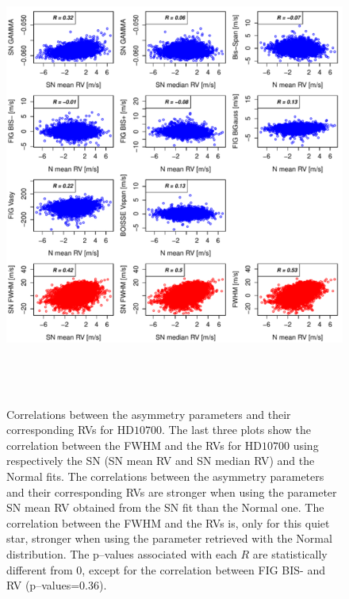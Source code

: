 \documentclass{aa}
\begin{document}
\begin{figure}[htbp]
\begin{center}
\includegraphics[height = 6in]{HD10700_[4]Comparison_para.pdf}  
   \caption{Correlations between the asymmetry parameters and their corresponding RVs for $\text{HD}10700$. The last three plots show the correlation between the FWHM and the RVs for $\text{HD}10700$ using respectively the SN (SN mean RV and SN median RV) and the Normal fits. The correlations between the asymmetry parameters and their corresponding RVs are stronger when using the parameter SN mean RV obtained from the SN fit than the Normal one. The correlation between the FWHM and the RVs is, only for this quiet star, stronger when using the parameter retrieved with the Normal distribution. The p--values associated with each $R$ are statistically different from $0$, except for the correlation between FIG BIS- and RV (p--values=0.36).}   
   \label{fig:Tau:corrPlot}
\end{center}
\end{figure}
\end{document}
